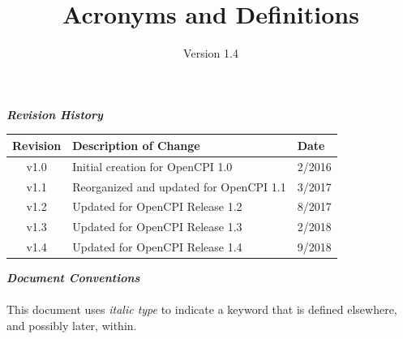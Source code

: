 \def\docTitle{Acronyms and Definitions}
\def\docVersion{1.4}

\date{Version \docVersion} %
\title{\docTitle}
\lhead{\small{\docTitle}}
\usepackage{enumitem}

\maketitle
\thispagestyle{fancy}
\newpage
\begin{center}
  \textit{\textbf{Revision History}}
  \begin{table}[H]
    \begin{tabularx}{\textwidth}{|c|X|l|}
      \hline
      \rowcolor{blue}
      \textbf{Revision} & \textbf{Description of Change} & \textbf{Date} \\
      \hline
      v1.0 & Initial creation for OpenCPI 1.0 & 2/2016 \\
      \hline
      v1.1 & Reorganized and updated for OpenCPI 1.1 & 3/2017 \\
      \hline
      v1.2 & Updated for OpenCPI Release 1.2 & 8/2017 \\
      \hline
      v1.3 & Updated for OpenCPI Release 1.3 & 2/2018 \\
      \hline
      v1.4 & Updated for OpenCPI Release 1.4 & 9/2018 \\
      \hline
    \end{tabularx}
  \end{table}
  \par
  \textit{\textbf{Document Conventions}}\\
  ~\\
  This document uses \textit{italic type} to indicate a keyword that is defined elsewhere, and possibly later, within.
\end{center}
\newpage
